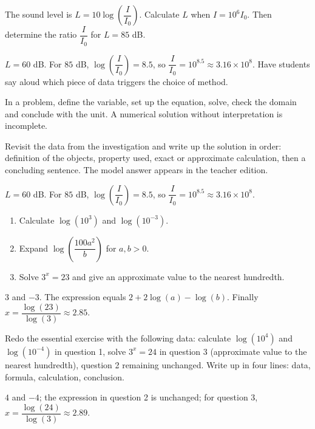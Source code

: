 \begin{activity}
The sound level is $L=10\log\!\left(\dfrac I{I_0}\right)$. Calculate $L$ when $I=10^6I_0$. Then determine the ratio $\dfrac I{I_0}$ for $L=85$ dB.

\end{activity}
\begin{solution}$L=60$ dB. For $85$ dB, $\log\!\left(\dfrac I{I_0}\right)=\num{8,5}$, so $\dfrac I{I_0}=10^{\num{8,5}}\approx\num{3,16}\times10^8$. Have students say aloud which piece of data triggers the choice of method.\end{solution}

\begin{summary}In a problem, define the variable, set up the equation, solve, check the domain and conclude with the unit. A numerical solution without interpretation is incomplete.\end{summary}

\begin{example}
Revisit the data from the investigation and write up the solution in order: definition of the objects, property used, exact or approximate calculation, then a concluding sentence. The model answer appears in the teacher edition.
\end{example}
\begin{solution}$L=60$ dB. For $85$ dB, $\log\!\left(\dfrac I{I_0}\right)=\num{8,5}$, so $\dfrac I{I_0}=10^{\num{8,5}}\approx\num{3,16}\times10^8$.\end{solution}

\begin{exercise}[essential]
\begin{enumerate}\item Calculate $\log(10^3)$ and $\log(10^{-3})$.\item Expand $\log\!\left(\dfrac{100a^2}{b}\right)$ for $a,b>0$.\item Solve $3^x=23$ and give an approximate value to the nearest hundredth.\end{enumerate}
\end{exercise}
\begin{solution}$3$ and $-3$. The expression equals $2+2\log(a)-\log(b)$. Finally $x=\dfrac{\log(23)}{\log(3)}\approx\num{2,85}$.\end{solution}


\begin{homework}Redo the essential exercise with the following data: calculate $\log(10^{4})$ and $\log(10^{-4})$ in question 1, solve $3^x=24$ in question 3 (approximate value to the nearest hundredth), question 2 remaining unchanged. Write up in four lines: data, formula, calculation, conclusion.\end{homework}
\begin{solution}$4$ and $-4$; the expression in question 2 is unchanged; for question 3, $x=\dfrac{\log(24)}{\log(3)}\approx\num{2,89}$.\end{solution}

